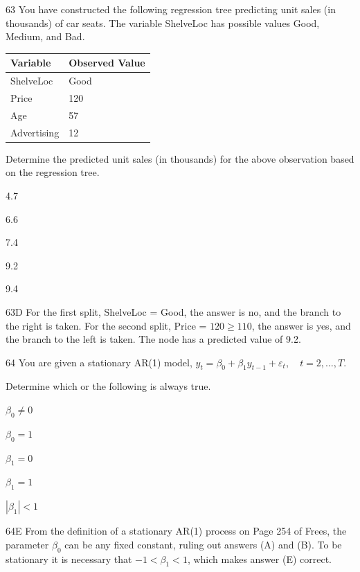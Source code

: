 \begin{question}{63}
You have constructed the following regression tree predicting unit sales (in thousands) of car seats. The variable ShelveLoc has possible values Good, Medium, and Bad.


\begin{center}
\begin{tabular}{|l|l|}
\hline
\textbf{Variable} & \textbf{Observed Value} \\ \hline
ShelveLoc   & Good   \\ \hline
Price       & 120    \\ \hline
Age         & 57     \\ \hline
Advertising & 12     \\ \hline
\end{tabular}
\end{center}

Determine the predicted unit sales (in thousands) for the above observation based on the regression tree.

\begin{choices}
\item 4.7
\item 6.6
\item 7.4
\item 9.2
\item 9.4
\end{choices}
\end{question}
\begin{solution}{63}{D}
For the first split, ShelveLoc = Good, the answer is no, and the branch to the right is taken. For the second split, Price = $120 \geqslant 110$, the answer is yes, and the branch to the left is taken. The node has a predicted value of 9.2.
\end{solution}

\begin{question}{64}
You are given a stationary AR(1) model, $y_t = \beta_0 + \beta_1 y_{t-1} + \varepsilon_t, \quad t = 2, \ldots, T.$

Determine which or the following is always true.

\begin{choices}
\item $\beta_0 \neq 0$
\item $\beta_0 = 1$
\item $\beta_1 = 0$
\item $\beta_1 = 1$
\item $|\beta_1| < 1$
\end{choices}
\end{question}
\begin{solution}{64}{E}
From the definition of a stationary AR(1) process on Page 254 of Frees, the parameter $\beta_0$ can be any fixed constant, ruling out answers (A) and (B). To be stationary it is necessary that $-1 < \beta_1 < 1$, which makes answer (E) correct.
\end{solution}

